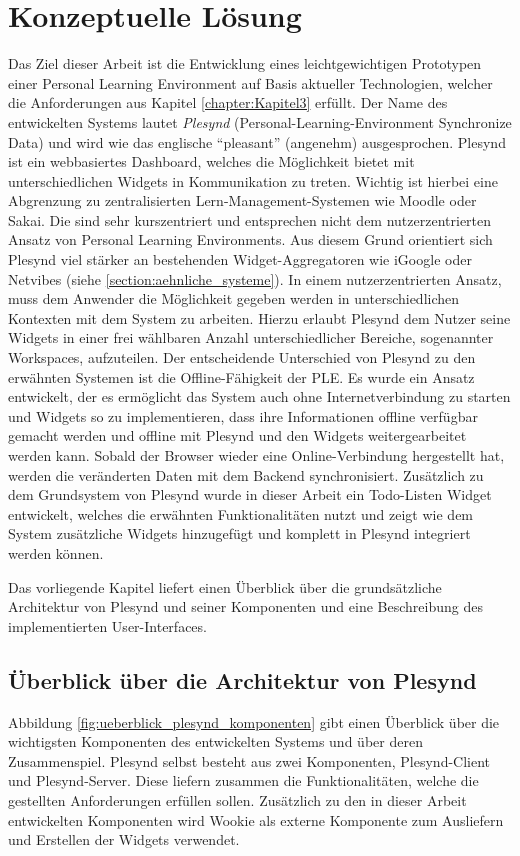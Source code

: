 \chapter{Konzeptuelle Lösung} 
\label{chapter:Kapitel5}
Das Ziel dieser Arbeit ist die Entwicklung eines leichtgewichtigen Prototypen einer Personal Learning Environment auf Basis aktueller Technologien, welcher die Anforderungen aus Kapitel \ref{chapter:Kapitel3} erfüllt. Der Name des entwickelten Systems lautet \emph{Plesynd} (Personal-Learning-Environment Synchronize Data) und wird wie das englische "`pleasant"' (angenehm) ausgesprochen. Plesynd ist ein webbasiertes Dashboard, welches die Möglichkeit bietet mit unterschiedlichen Widgets in Kommunikation zu treten. Wichtig ist hierbei eine Abgrenzung zu zentralisierten Lern-Management-Systemen wie Moodle oder Sakai. Die sind sehr kurszentriert und entsprechen nicht dem nutzerzentrierten Ansatz von Personal Learning Environments. Aus diesem Grund orientiert sich Plesynd viel stärker an bestehenden Widget-Aggregatoren wie iGoogle oder Netvibes (siehe \ref{section:aehnliche_systeme}). In einem nutzerzentrierten Ansatz, muss dem Anwender die Möglichkeit gegeben werden in unterschiedlichen Kontexten mit dem System zu arbeiten. Hierzu erlaubt Plesynd dem Nutzer seine Widgets in einer frei wählbaren Anzahl unterschiedlicher Bereiche, sogenannter Workspaces, aufzuteilen. Der entscheidende Unterschied von Plesynd zu den erwähnten Systemen ist die Offline-Fähigkeit der PLE. Es wurde ein Ansatz entwickelt, der es ermöglicht das System auch ohne Internetverbindung zu starten und Widgets so zu implementieren, dass ihre Informationen offline verfügbar gemacht werden und offline mit Plesynd und den Widgets weitergearbeitet werden kann. Sobald der Browser wieder eine Online-Verbindung hergestellt hat, werden die veränderten Daten mit dem Backend synchronisiert. Zusätzlich zu dem Grundsystem von Plesynd wurde in dieser Arbeit ein Todo-Listen Widget entwickelt, welches die erwähnten Funktionalitäten nutzt und zeigt wie dem System zusätzliche Widgets hinzugefügt und komplett in Plesynd integriert werden können.

Das vorliegende Kapitel liefert einen Überblick über die grundsätzliche Architektur von Plesynd und seiner Komponenten und eine Beschreibung des implementierten User-Interfaces.

\section{Überblick über die Architektur von Plesynd}\label{section:plesynd_architektur}
Abbildung \ref{fig:ueberblick_plesynd_komponenten} gibt einen Überblick über die wichtigsten Komponenten des entwickelten Systems und über deren Zusammenspiel. Plesynd selbst besteht aus zwei Komponenten, Plesynd-Client und Plesynd-Server. Diese liefern zusammen die Funktionalitäten, welche die gestellten Anforderungen erfüllen sollen. Zusätzlich zu den in dieser Arbeit entwickelten Komponenten wird Wookie als externe Komponente zum Ausliefern und Erstellen der Widgets verwendet.

